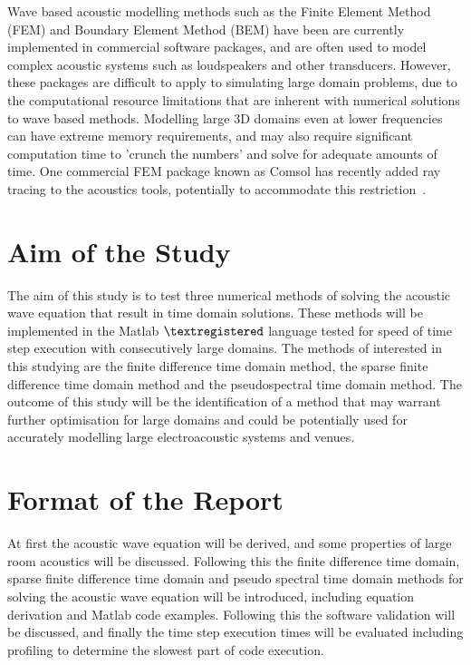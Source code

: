 Wave based acoustic modelling methods such as the Finite Element Method (FEM) and Boundary Element Method (BEM) have been are currently implemented in commercial software packages, and are often used to model complex acoustic systems such as loudspeakers and other transducers. However, these packages are difficult to apply to simulating large domain problems, due to the computational resource limitations that are inherent with numerical solutions to wave based methods. Modelling large 3D domains even at lower frequencies can have extreme memory requirements, and may also require significant computation time to 'crunch the numbers' and solve for adequate amounts of time. One commercial FEM package known as Comsol has recently added ray tracing to the acoustics tools, potentially to accommodate this restriction~\cite{Jensen2016}.\\

\section{Aim of the Study}

The aim of this study is to test three numerical methods of solving the acoustic wave equation that result in time domain solutions. These methods will be implemented in the Matlab $\textregistered $ language tested for speed of time step execution with consecutively large domains. The methods of interested in this studying are the finite difference time domain method, the sparse finite difference time domain method and the pseudospectral time domain method. The outcome of this study will be the identification of a method that may warrant further optimisation for large domains and could be potentially used for accurately modelling large electroacoustic systems and venues.\\

\section{Format of the Report}
At first the acoustic wave equation will be derived, and some properties of large room acoustics will be discussed. Following this the finite difference time domain, sparse finite difference time domain and pseudo spectral time domain methods for solving the acoustic wave equation will be introduced, including equation derivation and Matlab code examples. Following this the software validation will be discussed, and finally the time step execution times will be evaluated including profiling to determine the slowest part of code execution.\\

